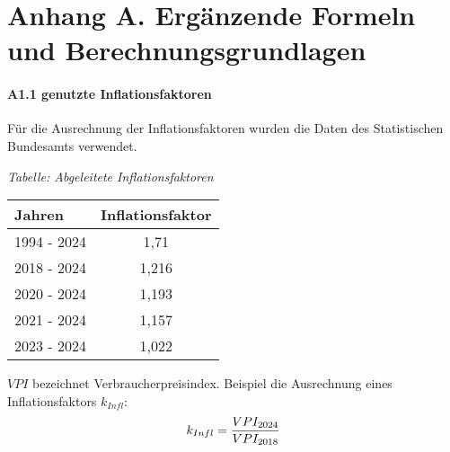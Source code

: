\chapter{Anhang A. Ergänzende Formeln und Berechnungsgrundlagen}
\subsubsection{A1.1 genutzte Inflationsfaktoren}
Für die Ausrechnung der Inflationsfaktoren wurden die Daten des Statistischen Bundesamts \cite{destatis2025} verwendet. 
\begin{table}[h]
	{\small \textit{Tabelle: Abgeleitete Inflationsfaktoren}}
	\begin{center}
	\label{Inflationsfaktoren}
	\begin{tabular}{|l|c|}
		\hline
		\textbf{Jahren} & \textbf{Inflationsfaktor} \\ \hline
		1994 - 2024 & 1,71 \\ \hline
		2018 - 2024 & 1,216 \\ \hline
		2020 - 2024 & 1,193 \\ \hline
        2021 - 2024 & 1,157 \\ \hline
        2023 - 2024 & 1,022 \\ \hline
	\end{tabular}
    \end{center}
\end{table}

$VPI$ bezeichnet Verbraucherpreisindex. Beispiel die Ausrechnung eines Inflationsfaktors $k_{Infl}$:
\begin{equation}
	{k_{Infl}} = \frac{VPI_{2024}}{VPI_{2018}} \\
 \end{equation}


 

